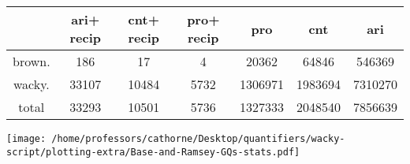 \documentclass[a4,10pt]{article}
\begin{document}
\begin{sidewaystable}[p]
\tiny{\begin{tabular}{|c|c|c|c|c|c|c|}
 & ari+
recip & cnt+
recip & pro+
recip & pro & cnt & ari\\
\hline
brown. & 186 & 17 & 4 & 20362 & 64846 & 546369\\
wacky. & 33107 & 10484 & 5732 & 1306971 & 1983694 & 7310270\\
\hline
total & 33293 & 10501 & 5736 & 1327333 & 2048540 & 7856639
\end{tabular}}
\end{sidewaystable}



\vspace{0.2cm}

\begin{center}
\texttt{[image: /home/professors/cathorne/Desktop/quantifiers/wacky-script/plotting-extra/Base-and-Ramsey-GQs-stats.pdf]}
\end{center}
\end{document}
